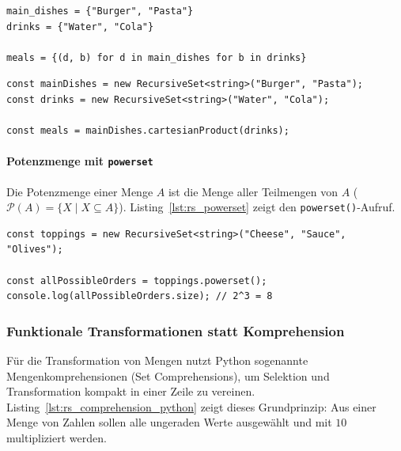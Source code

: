 \begin{listing}[ht]
    \caption{Kartesisches Produkt in Python und mit \texttt{RecursiveSet}}
    \label{lst:rs_cartesian_product}
    \begin{verbatim}
main_dishes = {"Burger", "Pasta"}
drinks = {"Water", "Cola"}

meals = {(d, b) for d in main_dishes for b in drinks}
    \end{verbatim}
    
    
    
    \begin{verbatim}
const mainDishes = new RecursiveSet<string>("Burger", "Pasta");
const drinks = new RecursiveSet<string>("Water", "Cola");

const meals = mainDishes.cartesianProduct(drinks);
    \end{verbatim}
\end{listing}

\paragraph{Potenzmenge mit \texttt{powerset}}
Die Potenzmenge einer Menge \(A\) ist die Menge aller Teilmengen von \(A\) (\(\mathcal{P}(A) = \{X \mid X \subseteq A\}\)). Listing~\ref{lst:rs_powerset} zeigt den \texttt{powerset()}-Aufruf.

\begin{listing}[ht]
    \caption{Potenzmenge mit \texttt{RecursiveSet}}
    \label{lst:rs_powerset}
    \begin{verbatim}
const toppings = new RecursiveSet<string>("Cheese", "Sauce", "Olives");

const allPossibleOrders = toppings.powerset();
console.log(allPossibleOrders.size); // 2^3 = 8
    \end{verbatim}
\end{listing}


\subsubsection{Funktionale Transformationen statt Komprehension}
\label{subsubsec:rs-api-funktional}

Für die Transformation von Mengen nutzt Python sogenannte Mengenkomprehensionen (Set Comprehensions), um Selektion und Transformation kompakt in einer Zeile zu vereinen. Listing~\ref{lst:rs_comprehension_python} zeigt dieses Grundprinzip: Aus einer Menge von Zahlen sollen alle ungeraden Werte ausgewählt und mit \(10\) multipliziert werden.

